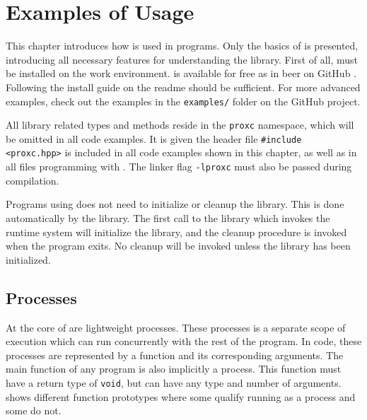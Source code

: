 

\chapter{Examples of Usage}
\label{ch:examples_usage}

This chapter introduces how \Proxc{} is used in \Cpp{} programs. Only the basics of \Proxc{} is presented, introducing all necessary features for understanding the library. First of all, \Proxc{} must be installed on the work environment. \Proxc{} is available for free as in beer on GitHub \citep{pettersen2017proxcgithub}. Following the install guide on the readme should be sufficient. For more advanced examples, check out the examples in the \texttt{examples/} folder on the GitHub project.

All library related types and methods reside in the \lstinline[style={CustomC++}]|proxc| namespace, which will be omitted in all code examples. It is given the header file \lstinline[style={CustomC++}]|#include <proxc.hpp>| is included in all code examples shown in this chapter, as well as in all \Cpp{} files programming with \Proxc. The linker flag \lstinline[style={CustomC++}]|-lproxc| must also be passed during compilation.

Programs using \Proxc{} does not need to initialize or cleanup the library. This is done automatically by the library. The first call to the library which invokes the runtime system will initialize the library, and the cleanup procedure is invoked when the program exits. No cleanup will be invoked unless the library has been initialized. 


\section{Processes}


At the core of \Proxc{} are lightweight processes. These processes is a separate scope of execution which can run concurrently with the rest of the program. In code, these processes are represented by a function and its corresponding arguments. The main function of any \Cpp{} program is also implicitly a process. This function must have a return type of \lstinline[style={CustomC++}]|void|, but can have any type and number of arguments.  shows different function prototypes where some qualify running as a process and some do not.

